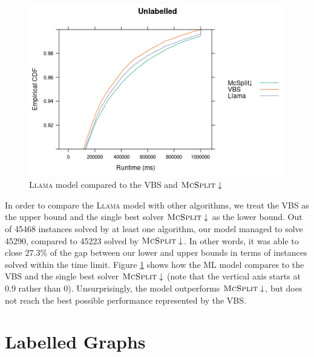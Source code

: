 \documentclass{l4proj}
\theoremstyle{definition}
\theoremstyle{remark}
\begin{document}
\begin{figure}
  \centering
  \includegraphics[scale=0.7]{images/ecdf_unlabelled_llama.png}
  \caption{\textsc{Llama} model compared to the VBS and
    $\textsc{McSplit}\downarrow$}
  \label{fig:ecdf_unlabelled_llama}
\end{figure}

In order to compare the \textsc{Llama} model with other algorithms, we treat the
VBS as the upper bound and the single best solver $\textsc{McSplit}\downarrow$
as the lower bound. Out of 45468 instances solved by at least one algorithm, our
model managed to solve 45290, compared to 45223 solved by
$\textsc{McSplit}\downarrow$. In other words, it was able to close 27.3\% of the
gap between our lower and upper bounds in terms of instances solved within the
time limit. Figure \ref{fig:ecdf_unlabelled_llama} shows how the ML model
compares to the VBS and the single best solver $\textsc{McSplit}\downarrow$
(note that the vertical axis starts at 0.9 rather than 0). Unsurprisingly, the
model outperforms $\textsc{McSplit}\downarrow$, but does not reach the best
possible performance represented by the VBS.

\section{Labelled Graphs}
\end{document}
